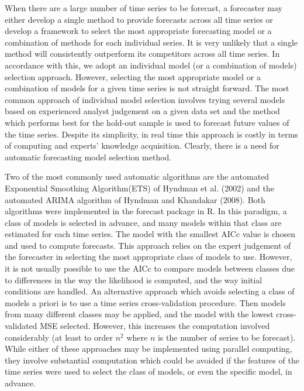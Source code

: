\documentclass[11pt,]{article}
\theoremstyle{definition}
\theoremstyle{definition}
\theoremstyle{definition}
\theoremstyle{remark}
\begin{document}
When there are a large number of time series to be forecast, a
forecaster may either develop a single method to provide forecasts
across all time series or develop a framework to select the most
appropriate forecasting model or a combination of methods for each
individual series. It is very unlikely that a single method will
consistently outperform its competitors across all time series. In
accordance with this, we adopt an individual model (or a combination of
models) selection approach. However, selecting the most appropriate
model or a combination of models for a given time series is not straight
forward. The most common approach of individual model selection involves
trying several models based on experienced analyst judgement on a given
data set and the method which performs best for the hold-out sample is
used to forecast future values of the time series. Despite its
simplicity, in real time this approach is costly in terms of computing
and experts' knowledge acquisition. Clearly, there is a need for
automatic forecasting model selection method.

Two of the most commonly used automatic algorithms are the automated
Exponential Smoothing Algorithm(ETS) of Hyndman et al. (2002) and the
automated ARIMA algorithm of Hyndman and Khandakar (2008). Both
algorithms were implemented in the forecast package in R. In this
paradigm, a class of models is selected in advance, and many models
within that class are estimated for each time series. The model with the
smallest AICc value is chosen and used to compute forecasts. This
approach relies on the expert judgement of the forecaster in selecting
the most appropriate class of models to use. However, it is not usually
possible to use the AICc to compare models between classes due to
differences in the way the likelihood is computed, and the way initial
conditions are handled. An alternative approach which avoids selecting a
class of models a priori is to use a time series cross-validation
procedure. Then models from many different classes may be applied, and
the model with the lowest cross-validated MSE selected. However, this
increases the computation involved considerably (at least to order
\(n^2\) where \(n\) is the number of series to be forecast). While
either of these approaches may be implemented using parallel computing,
they involve substantial computation which could be avoided if the
features of the time series were used to select the class of models, or
even the specific model, in advance.
\end{document}
